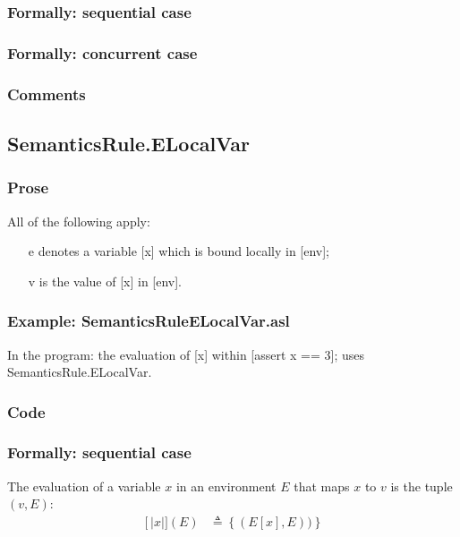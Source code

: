 \documentclass{book}
\newcommand\llbracket{[|}
\newcommand\rrbracket{|]}
\newcommand\interp[1]{\left\llbracket #1 \right\rrbracket}
\begin{document}
  \subsubsection{Formally: sequential case}
  
  \subsubsection{Formally: concurrent case}

  \subsubsection{Comments}

\subsection{SemanticsRule.ELocalVar \label{sec:SemanticsRule.ELocalVar}}

  \subsubsection{Prose}
  All of the following apply:
  \begin{itemize}
  \item [e] denotes a variable [x] which is bound locally in [env];
  \item [v] is the value of [x] in [env].
  \end{itemize}

  \subsubsection{Example: SemanticsRuleELocalVar.asl}
    In the program:
    the evaluation of [x] within [assert x == 3]; uses SemanticsRule.ELocalVar.

  \subsubsection{Code}

  \subsubsection{Formally: sequential case}
  The evaluation of a variable $x$ in an environment $E$ that maps $x$ to $v$
  is the tuple $(v,E)$: 
  \begin{align}
  \interp{x} (E) & \triangleq \left\{ (E[x], E)) \right\}
  \label{eq:sem-det-var}
  \end{align} 
 
\end{document}

